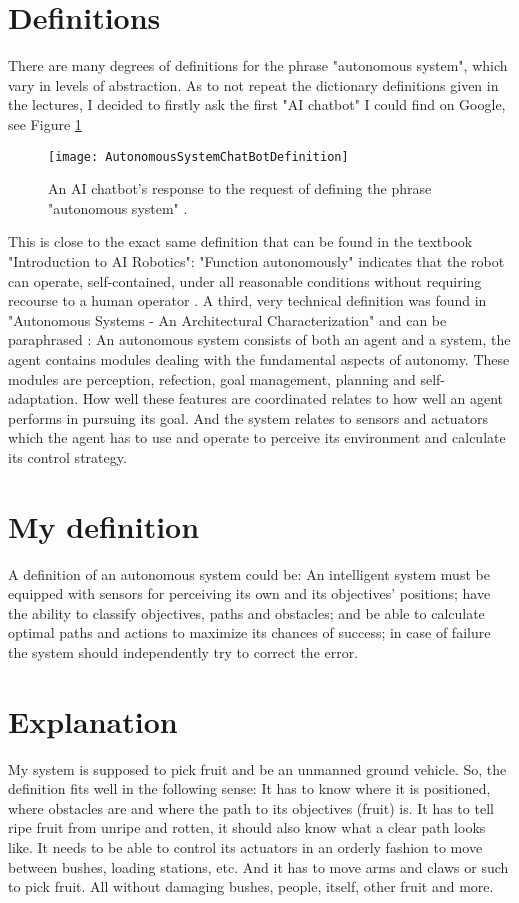 \documentclass[%
oneside,    %
project,    %
nosummary   %
]{USN-MSc}
\begin{document}
\section{Definitions}
There are many degrees of definitions for the phrase "autonomous system", which vary in levels of abstraction. 
As to not repeat the dictionary definitions given in the lectures, I decided to firstly ask the first "AI chatbot" I could find on Google, see Figure \ref{fig:chat-bot}
\begin{figure}[!ht]
  \centering
  \texttt{[image: AutonomousSystemChatBotDefinition]}
  \caption{An AI chatbot's response to the request of defining the phrase "autonomous system" \cite{ChaiChat90:online}.}
  \label{fig:chat-bot}
\end{figure}
This is close to the exact same definition that can be found in the textbook "Introduction to AI Robotics":
"Function autonomously" indicates that the robot can operate, self-contained, under all reasonable conditions without requiring recourse to a human operator 
\cite{murphy2000introduction}.
A third, very technical definition was found in "Autonomous Systems - An Architectural Characterization" and can be paraphrased \cite{Sifakis}:
An autonomous system consists of both an agent and a system, the agent contains modules dealing with the fundamental aspects of autonomy.
These modules are perception, refection, goal management, planning and self-adaptation. How well these features are coordinated relates to how well an agent performs in pursuing its goal.
And the system relates to sensors and actuators which the agent has to use and operate to perceive its environment and calculate its control strategy.

\section{My definition}
\label{sec:myDefinition}
A definition of an autonomous system could be:
An intelligent system must be equipped with sensors for perceiving its own and its objectives' positions; 
have the ability to classify objectives, paths and obstacles; 
and be able to calculate optimal paths and actions to maximize its chances of success;
in case of failure the system should independently try to correct the error.

\section{Explanation}
\label{sec:myExplanation}
My system is supposed to pick fruit and be an unmanned ground vehicle.
So, the definition fits well in the following sense:
It has to know where it is positioned, where obstacles are and where the path to its objectives (fruit) is.
It has to tell ripe fruit from unripe and rotten, it should also know what a clear path looks like.
It needs to be able to control its actuators in an orderly fashion to move between bushes, loading stations, etc. 
And it has to move arms and claws or such to pick fruit. All without damaging bushes, people, itself, other fruit and more.
\end{document}
